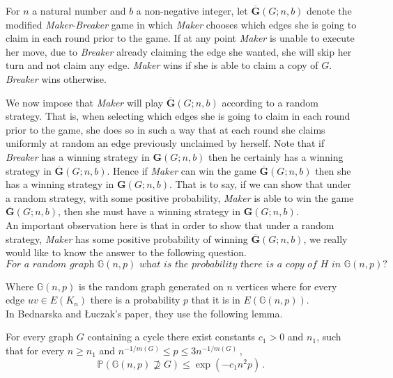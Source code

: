 \documentclass[a4paper,oneside,11pt]{report}
\begin{document}
\begin{definition}

For $n$ a natural number and $b$ a non-negative integer, let $\overline{\textbf{G}}(G;n,b)$ denote the modified \textit{Maker}-\textit{Breaker} game in which \textit{Maker} chooses which edges she is going to claim in each round prior to the game. If at any point \textit{Maker} is unable to execute her move, due to \textit{Breaker} already claiming the edge she wanted, she will skip her turn and not claim any edge. \textit{Maker} wins if she is able to claim a copy of $G$. \textit{Breaker} wins otherwise.
    
\end{definition}

We now impose that \textit{Maker} will play $\overline{\textbf{G}}(G;n,b)$ according to a random strategy. That is, when selecting which edges she is going to claim in each round prior to the game, she does so in such a way that at each round she claims uniformly at random an edge previously unclaimed by herself. Note that if \textit{Breaker} has a winning strategy in $\textbf{G}(G;n,b)$ then he certainly has a winning strategy in $\overline{\textbf{G}}(G;n,b)$. Hence if \textit{Maker} can win the game $\overline{\textbf{G}}(G;n,b)$ then she has a winning strategy in $\textbf{G}(G;n,b)$. That is to say, if we can show that under a random strategy, with some positive probability, \textit{Maker} is able to win  the game $\overline{\textbf{G}}(G;n,b)$, then she must have a winning strategy in $\textbf{G}(G;n,b)$.\\

An important observation here is that in order to show that under a random strategy, \textit{Maker} has some positive probability of winning $\overline{\textbf{G}}(G;n,b)$, we really would like to know the answer to the following question. \[\textit{For a random graph }\mathbb{G}(n,p) \textit{ what is the probability there is a copy of } H \textit{ in } \mathbb{G}(n,p) \text{?}  \]

Where $\mathbb{G}(n,p)$ is the random graph generated on $n$ vertices where for every edge $uv \in E(K_n)$ there is a probability $p$ that it is in $E(\mathbb{G}(n,p))$.\\

In Bednarska and \L{}uczak's paper, they use the following lemma.

\begin{lemma} \label{2}

For every graph $G$ containing a cycle there exist constants $c_1 > 0$ and $n_1$, such that for every $n \geqslant n_1$ and $n^{-1/m(G)} \leqslant p \leqslant 3n^{-1/m(G)}\,,$ \[\mathbb{P}(\mathbb{G}(n,p) \not\supseteq G) \leqslant \exp(-c_1n^2p)\,.\]  

\end{lemma}
\end{document}
